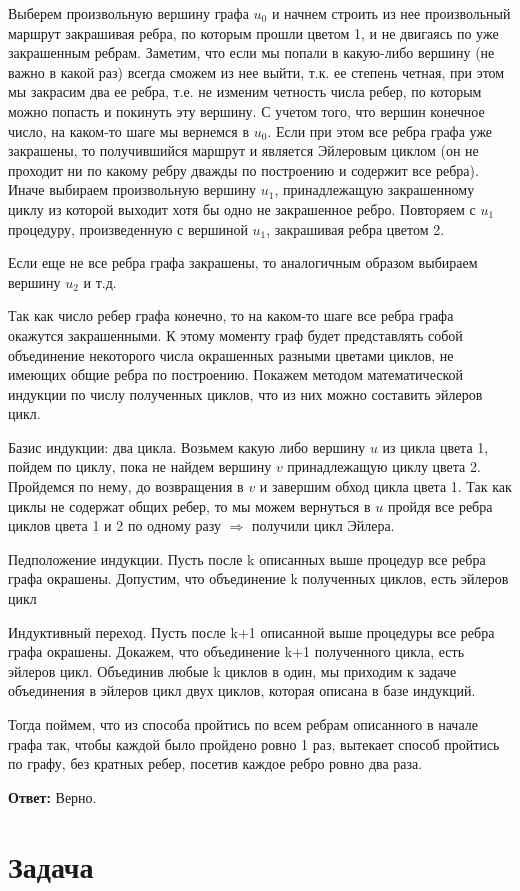 \documentclass{article}
\begin{document}
Выберем произвольную вершину графа $u_0$ и начнем строить из нее произвольный маршрут закрашивая ребра, по которым прошли цветом 1, и не двигаясь по уже закрашенным ребрам.
Заметим, что если мы попали в какую-либо вершину (не важно в какой раз) всегда сможем из нее выйти, т.к. ее степень четная, при этом мы закрасим два ее ребра, т.е. не изменим четность числа ребер, по которым можно попасть и покинуть эту вершину. С учетом того, что вершин конечное число,  на каком-то шаге мы вернемся в $u_0$. Если при этом все ребра графа уже закрашены, то получившийся маршрут и является Эйлеровым циклом (он не проходит ни по какому ребру дважды по построению и содержит все ребра). Иначе выбираем произвольную вершину $u_1$, принадлежащую закрашенному циклу из которой выходит хотя бы одно не закрашенное ребро. Повторяем с $u_1$  процедуру, произведенную с вершиной $u_1$, закрашивая ребра цветом 2.

Если еще не все ребра графа закрашены, то аналогичным образом выбираем вершину $u_2$ и т.д.

Так как число ребер графа конечно, то на каком-то шаге все ребра графа окажутся закрашенными. К этому моменту граф будет представлять собой объединение некоторого числа окрашенных разными цветами циклов, не имеющих общие ребра по построению.
Покажем методом математической индукции по числу полученных  циклов, что из них можно составить эйлеров цикл.

Базис индукции: два цикла.
Возьмем какую либо вершину $u$ из цикла цвета 1, пойдем по циклу, пока не найдем вершину $v$ принадлежащую циклу цвета 2. Пройдемся по нему, до возвращения в $v$ и завершим обход цикла цвета 1. Так как циклы не содержат общих ребер, то мы можем вернуться в $u$ пройдя все ребра циклов цвета 1 и 2 по одному разу $\Rightarrow$ получили цикл Эйлера. 

Педположение индукции.
Пусть после k описанных выше процедур все ребра графа окрашены.
Допустим, что  объединение k полученных  циклов, есть эйлеров цикл

Индуктивный переход.
Пусть после k+1 описанной выше процедуры все ребра графа окрашены. Докажем, что объединение k+1 полученного цикла, есть эйлеров цикл. Объединив любые k циклов в один, мы приходим к задаче объединения в эйлеров цикл двух циклов, которая описана в базе индукций.

Тогда поймем, что из способа пройтись по всем ребрам описанного в начале графа так, чтобы каждой было пройдено 
ровно 1 раз, вытекает способ пройтись по графу, без кратных ребер, посетив каждое ребро ровно два раза.

\textbf{Ответ:} Верно.

\section{Задача }
\end{document}
